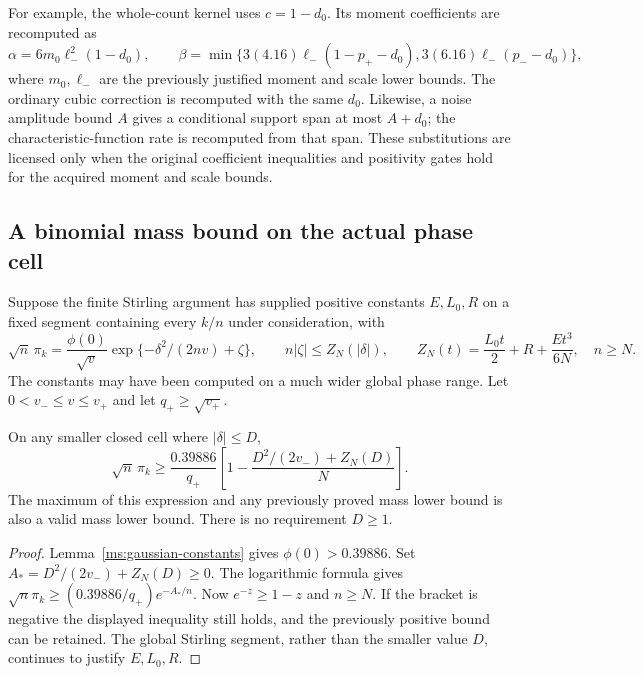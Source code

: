 For example, the whole-count kernel uses $c=1-d_0$. Its moment coefficients
are recomputed as
\[
 \alpha=6m_0\ell_-^2(1-d_0),\qquad
 \beta=\min\{3(4.16)\ell_-(1-p_+-d_0),
                  3(6.16)\ell_-(p_--d_0)\},
\]
where $m_0,\ell_-$ are the previously justified moment and scale lower
bounds. The ordinary cubic correction is recomputed with the same $d_0$.
Likewise, a noise amplitude bound $A$ gives a conditional support span at
most $A+d_0$; the characteristic-function rate is recomputed from that span.
These substitutions are licensed only when the original coefficient
inequalities and positivity gates hold for the acquired moment and scale
bounds.

\subsection{A binomial mass bound on the actual phase cell}
Suppose the finite Stirling argument has supplied positive constants
$E,L_0,R$ on a fixed segment containing every $k/n$ under consideration, with
\[
 \sqrt n\,\pi_k=\frac{\phi(0)}{\sqrt v}
       \exp\{-\delta^2/(2nv)+\zeta\},\qquad
 n|\zeta|\le Z_N(|\delta|),\qquad
 Z_N(t)=\frac{L_0t}{2}+R+\frac{Et^3}{6N},
 \quad n\ge N.
\]
The constants may have been computed on a much wider global phase range.
Let $0<v_-\le v\le v_+$ and let $q_+\ge\sqrt{v_+}$.
\begin{lemma}\label{ms:local42:lem:mass}
On any smaller closed cell where $|\delta|\le D$,
\[
 \sqrt n\,\pi_k\ge
 \frac{0.39886}{q_+}
 \left[1-\frac{D^2/(2v_-)+Z_N(D)}N\right].
\]
The maximum of this expression and any previously proved mass lower bound
is also a valid mass lower bound. There is no requirement $D\ge1$.
\end{lemma}
\begin{proof}
Lemma~\ref{ms:gaussian-constants} gives $\phi(0)>0.39886$. Set $A_*=D^2/(2v_-)+Z_N(D)\ge0$. The logarithmic formula gives
$\sqrt n\pi_k\ge(0.39886/q_+)e^{-A_*/n}$.
Now $e^{-z}\ge1-z$ and $n\ge N$. If the bracket is negative the displayed
inequality still holds, and the previously positive bound can be retained.
The global Stirling segment, rather than the smaller value $D$, continues
to justify $E,L_0,R$.
\end{proof}

